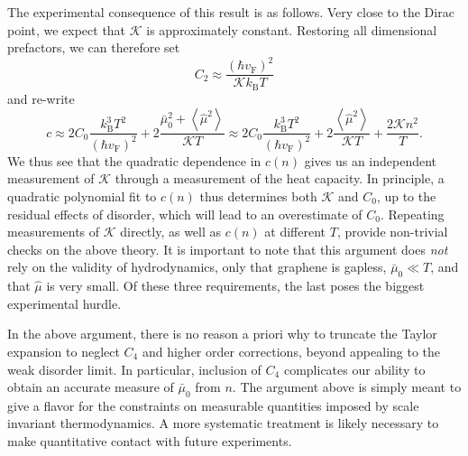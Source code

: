 \documentclass[10pt, oneside]{book}
\begin{document}
\begin{doublespace}
\begin{appendix}
The experimental consequence of this result is as follows.   Very close to the Dirac point, we expect that $\mathcal{K}$ is approximately constant.   Restoring all dimensional prefactors, we can therefore set \begin{equation}
C_2 \approx \frac{(\hbar v_{\mathrm{F}})^2}{\mathcal{K}k_{\mathrm{B}}T}
\end{equation}
and re-write \begin{equation}
c \approx 2C_0 \frac{k_{\mathrm{B}}^3T^2}{(\hbar v_{\mathrm{F}})^2} + 2\frac{\bar\mu_0^2+\left\langle \hat\mu^2\right\rangle}{\mathcal{K}T} \approx 2C_0 \frac{k_{\mathrm{B}}^3T^2}{(\hbar v_{\mathrm{F}})^2} + 2\frac{\left\langle \hat\mu^2\right\rangle}{\mathcal{K}T} + \frac{2\mathcal{K}  n^2}{T} .
\end{equation}
We thus see that the quadratic dependence in $c(n)$ gives us an independent measurement of $\mathcal{K}$ through a measurement of the heat capacity.   In principle, a quadratic polynomial fit to $c(n)$ thus determines both $\mathcal{K}$ and $C_0$,  up to the residual effects of disorder, which will lead to an overestimate of $C_0$.   Repeating measurements of $\mathcal{K}$ directly, as well as $c(n)$ at different $T$,  provide non-trivial checks on the above theory.   It is important to note that this argument does \emph{not} rely on the validity of hydrodynamics, only that graphene is gapless, $\bar\mu_0 \ll T$, and that $\hat\mu$ is very small.   Of these three requirements, the last poses the biggest experimental hurdle.


In the above argument, there is no reason a priori why to truncate the Taylor expansion to neglect $C_4$ and higher order corrections, beyond appealing to the weak disorder limit.   In particular, inclusion of $C_4$ complicates our ability to obtain an accurate measure of $\bar\mu_0$ from $n$.    The argument above is simply meant to give a flavor for the constraints on measurable quantities imposed by scale invariant thermodynamics.   A more systematic treatment is likely necessary to make quantitative contact with future experiments.


\end{appendix}
\end{doublespace}
\end{document}
